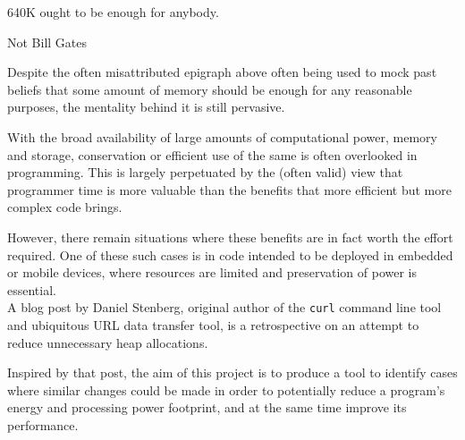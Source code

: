 \epigraph{640K ought to be enough for anybody.}{Not Bill Gates}

Despite the often misattributed epigraph above often being used to mock past beliefs that some amount of memory should be enough for any reasonable purposes, the mentality behind it is still pervasive.

With the broad availability of large amounts of computational power, memory and storage, conservation or efficient use of the same is often overlooked in programming. This is largely perpetuated by the (often valid) view that programmer time is more valuable than the benefits that more efficient but more complex code brings.

However, there remain situations where these benefits are in fact worth the effort required. One of these such cases is in code intended to be deployed in embedded or mobile devices, where resources are limited and preservation of power is essential. \\
A blog post \cite{curlmalloc} by Daniel Stenberg, original author of the \texttt{curl} command line tool and ubiquitous URL data transfer tool, is a retrospective on an attempt to reduce unnecessary heap allocations.

Inspired by that post, the aim of this project is to produce a tool to identify cases where similar changes could be made in order to potentially reduce a program's energy and processing power footprint, and at the same time improve its performance.

